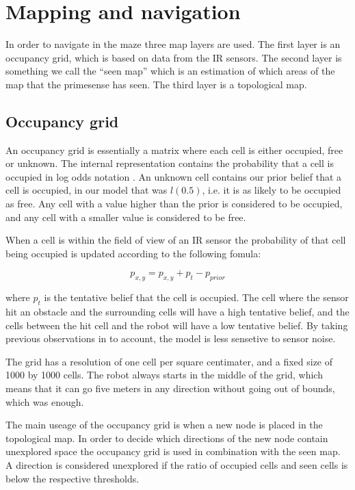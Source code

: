 \section{Mapping and navigation}
In order to navigate in the maze three map layers are used. The first layer is an occupancy grid, which is based on data from the IR sensors. The second layer is something we call the ``seen map'' which is an estimation of which areas of the map that the primesense has seen. The third layer is a topological map.

\subsection{Occupancy grid}
An occupancy grid is essentially a matrix where each cell is either occupied, free or unknown. 
The internal representation contains the probability that a cell is occupied in log odds notation \cite{wiki:Logit}.
An unknown cell contains our prior belief that a cell is occupied, in our model that was $l(0.5)$, i.e. it is as likely to be occupied as free.  
Any cell with a value higher than the prior is considered to be occupied, and any cell with a smaller value is considered to be free.

When a cell is within the field of view of an IR sensor the probability of that cell being occupied is updated according to the following fomula:

\begin{equation}
p_{x, y} = p_{x, y} + p_{t} - p_{prior}
\end{equation}

where $p_{t}$ is the tentative belief that the cell is occupied. The cell where the sensor hit an obstacle and the surrounding cells will have a high tentative belief, and the cells between the hit cell and the robot will have a low tentative belief. By taking previous observations in to account, the model is less sensetive to sensor noise. \cite{GridLecture}

The grid has a resolution of one cell per square centimater, and a fixed size of 1000 by 1000 cells. 
The robot always starts in the middle of the grid, which means that it can go five meters in any direction without going out of bounds, which was enough.

The main useage of the occupancy grid is when a new node is placed in the topological map. 
In order to decide which directions of the new node contain unexplored space the occupancy grid is used in combination with the seen map. 
A direction is considered unexplored if the ratio of occupied cells and seen cells is below the respective thresholds.

